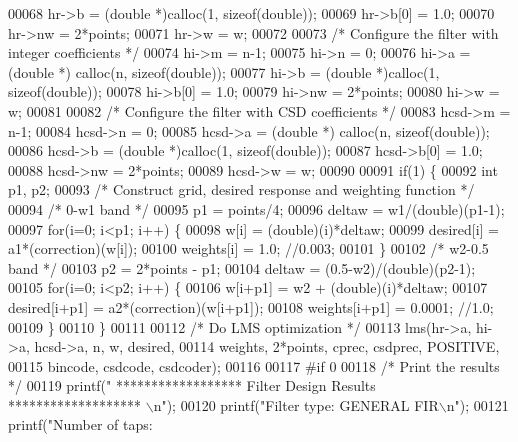 \begin{DoxyCode}
00068   hr->b = (\textcolor{keywordtype}{double} *)calloc(1, \textcolor{keyword}{sizeof}(\textcolor{keywordtype}{double}));
00069   hr->b[0] = 1.0;
00070   hr->nw = 2*points;
00071   hr->w = w;
00072 
00073   \textcolor{comment}{/* Configure the filter with integer coefficients */}
00074   hi->m = n-1;
00075   hi->n = 0;
00076   hi->a = (\textcolor{keywordtype}{double} *) calloc(n, \textcolor{keyword}{sizeof}(\textcolor{keywordtype}{double}));
00077   hi->b = (\textcolor{keywordtype}{double} *)calloc(1, \textcolor{keyword}{sizeof}(\textcolor{keywordtype}{double}));
00078   hi->b[0] = 1.0;
00079   hi->nw = 2*points;
00080   hi->w = w;
00081 
00082   \textcolor{comment}{/* Configure the filter with CSD coefficients */}
00083   hcsd->m = n-1;
00084   hcsd->n = 0;
00085   hcsd->a = (\textcolor{keywordtype}{double} *) calloc(n, \textcolor{keyword}{sizeof}(\textcolor{keywordtype}{double}));
00086   hcsd->b = (\textcolor{keywordtype}{double} *)calloc(1, \textcolor{keyword}{sizeof}(\textcolor{keywordtype}{double}));
00087   hcsd->b[0] = 1.0;
00088   hcsd->nw = 2*points;
00089   hcsd->w = w;
00090 
00091   \textcolor{keywordflow}{if}(1) \{
00092     \textcolor{keywordtype}{int} p1, p2;
00093     \textcolor{comment}{/* Construct grid, desired response and weighting function */}
00094     \textcolor{comment}{/* 0-w1 band */}
00095     p1 = points/4;
00096     deltaw = w1/(double)(p1-1);
00097     \textcolor{keywordflow}{for}(i=0; i<p1; i++) \{
00098       w[i] = (double)(i)*deltaw;
00099       desired[i] = a1*(correction)(w[i]);
00100       weights[i] =  1.0; \textcolor{comment}{//0.003;}
00101     \}
00102     \textcolor{comment}{/* w2-0.5 band */}
00103     p2 = 2*points - p1;
00104     deltaw = (0.5-w2)/(\textcolor{keywordtype}{double})(p2-1);
00105     \textcolor{keywordflow}{for}(i=0; i<p2; i++) \{
00106       w[i+p1] = w2 + (double)(i)*deltaw;
00107       desired[i+p1] = a2*(correction)(w[i+p1]);
00108       weights[i+p1] = 0.0001; \textcolor{comment}{//1.0;}
00109     \}
00110   \}
00111 
00112   \textcolor{comment}{/* Do LMS optimization */}
00113   lms(hr->a, hi->a, hcsd->a, n, w, desired, 
00114       weights, 2*points, cprec, csdprec, POSITIVE,
00115       bincode, csdcode, csdcoder);
00116 
00117 \textcolor{preprocessor}{#if 0}
00118   \textcolor{comment}{/* Print the results */}
00119   printf(\textcolor{stringliteral}{" ****************** Filter Design Results ******************* \(\backslash\)n"});
00120   printf(\textcolor{stringliteral}{"Filter type:            GENERAL FIR\(\backslash\)n"});
00121   printf(\textcolor{stringliteral}{"Number of taps:         %
}
\end{DoxyCode}
